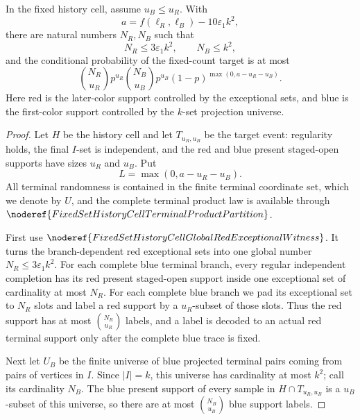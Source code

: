 \begin{helper}
In the fixed history cell, assume \(u_B\le u_R\).  With
\[
a=f(\ell_R,\ell_B)-10\varepsilon_1 k^2,
\]
there are natural numbers \(N_R,N_B\) such that
\[
N_R\le 3\varepsilon_1 k^2,\qquad N_B\le k^2,
\]
and the conditional probability of the fixed-count target is at most
\[
\binom{N_R}{u_R}p^{u_R}\binom{N_B}{u_B}p^{u_B}
(1-p)^{\max(0,a-u_R-u_B)}.
\]
Here red is the later-color support controlled by the exceptional sets, and
blue is the first-color support controlled by the \(k\)-set projection
universe.
\end{helper}
\begin{proof}
Let \(H\) be the history cell and let \(T_{u_R,u_B}\) be the target event:
regularity holds, the final \(I\)-set is independent, and the red and blue
present staged-open supports have sizes \(u_R\) and \(u_B\).  Put
\[
L=\max(0,a-u_R-u_B).
\]
All terminal randomness is contained in the finite terminal coordinate set,
which we denote by \(U\), and the complete terminal product law is available through
\(\noderef{FixedSetHistoryCellTerminalProductPartition}\).

First use \(\noderef{FixedSetHistoryCellGlobalRedExceptionalWitness}\).  It
turns the branch-dependent red exceptional sets into one global number
\(N_R\le3\varepsilon_1k^2\).  For each complete blue terminal branch, every
regular independent completion has its red present staged-open support inside
one exceptional set of cardinality at most \(N_R\).  For each complete blue
branch we pad its exceptional set to \(N_R\) slots and label a red support by
a \(u_R\)-subset of those slots.  Thus the red support has at most
\(\binom{N_R}{u_R}\) labels, and a label is decoded to an actual red terminal
support only after the complete blue trace is fixed.

Next let \(U_B\) be the finite universe of blue projected terminal pairs
coming from pairs of vertices in \(I\).  Since \(|I|=k\), this universe has
cardinality at most \(k^2\); call its cardinality \(N_B\).  The blue present
support of every sample in \(H\cap T_{u_R,u_B}\) is a \(u_B\)-subset of this
universe, so there are at most \(\binom{N_B}{u_B}\) blue support labels.


\end{proof}
